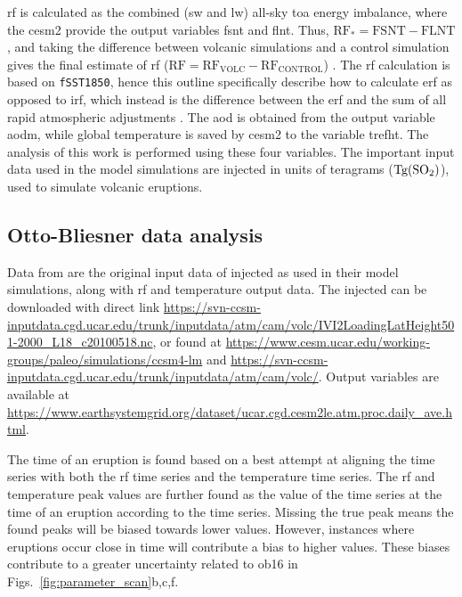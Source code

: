 \documentclass{ametsocV6.1}
\newcommand{\iso}[1][i]{{#1}njected \ce{SO2}}
\begin{document}
\gls{rf} is calculated as the combined (\gls{sw} and \gls{lw}) all-sky \gls{toa} energy
imbalance, where the \gls{cesm2} provide the output variables \gls{fsnt} and \gls{flnt}.
Thus, \(\mathrm{RF_*}= \mathrm{FSNT} - \mathrm{FLNT}\), and taking the difference
between volcanic simulations and a control simulation gives the final estimate of
\gls{rf} (\(\mathrm{RF}=\mathrm{RF_{VOLC}}-\mathrm{RF_{CONTROL}}\))
\citep{marshall2020}. The \gls{rf} calculation is based on \texttt{fSST1850}, hence this
outline specifically describe how to calculate \gls{erf} as opposed to \gls{irf}, which
instead is the difference between the \gls{erf} and the sum of all rapid atmospheric
adjustments \citep{marshall2020,smith2018}. The \gls{aod} is obtained from the output
variable \gls{aodm}, while global temperature is saved by \gls{cesm2} to the variable
\gls{trefht}. The analysis of this work is performed using these four variables. The
important input data used in the model simulations are \iso{} in units of teragrams
(\(\si{\tera\gram(\ce{SO2})}\)), used to simulate volcanic eruptions.

\appendix[B]


\subsection{Otto-Bliesner data analysis}\label{ap:ob16}

Data from \citet{ottobliesner2016} are the original input data of \iso{} as used in
their model simulations, along with \gls{rf} and temperature output data. The \iso{} can
be downloaded with direct link
\url{https://svn-ccsm-inputdata.cgd.ucar.edu/trunk/inputdata/atm/cam/volc/IVI2LoadingLatHeight501-2000_L18_c20100518.nc},
or found at \url{https://www.cesm.ucar.edu/working-groups/paleo/simulations/ccsm4-lm}
and \url{https://svn-ccsm-inputdata.cgd.ucar.edu/trunk/inputdata/atm/cam/volc/}. Output
variables are available at
\url{https://www.earthsystemgrid.org/dataset/ucar.cgd.cesm2le.atm.proc.daily_ave.html}.

The time of an eruption is found based on a best attempt at aligning the  time
series with both the \gls{rf} time series and the temperature time series. The \gls{rf}
and temperature peak values are further found as the value of the time series at the
time of an eruption according to the  time series. Missing the true peak means
the found peaks will be biased towards lower values. However, instances where eruptions
occur close in time will contribute a bias to higher values. These biases contribute to
a greater uncertainty related to \gls{ob16} in Figs.~\ref{fig:parameter_scan}b,c,f.
\end{document}
